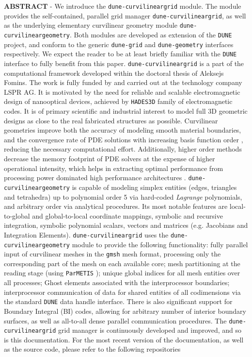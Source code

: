 \documentclass[a4paper,11pt]{article}
\newcommand{\citeParMetis}{\cite{schloegel+2002, lasalle+2013}}
\newcommand{\citeGMSH}{\cite{geuzaine+2009}}
\newcommand{\citeDune}{\cite{bastian+2008}}
\newcommand{\dune}{\setlength\emergencystretch{3cm}\texttt{DUNE}}
\newcommand{\gmsh}{\setlength\emergencystretch{3cm}\texttt{gmsh}}
\newcommand{\ParMETIS}{\setlength\emergencystretch{3cm}\texttt{ParMETIS}}
\newcommand{\hades}{\setlength\emergencystretch{3cm}\texttt{HADES3D}}
\newcommand{\dunegeom}{\setlength\emergencystretch{3cm}\texttt{dune-geometry}}
\newcommand{\dunegrid}{\setlength\emergencystretch{3cm}\texttt{dune-grid}}
\newcommand{\curvgeom}{\setlength\emergencystretch{3cm}\texttt{dune-curvilineargeometry}}
\newcommand{\curvgrid}{\setlength\emergencystretch{3cm}\texttt{dune-curvilineargrid}}
\begin{document}
\noindent \textbf{\textsc{ABSTRACT}} - We introduce the \curvgrid{} module. The module provides the self-contained, parallel grid manager \curvgrid{}, as well as the underlying elementary curvilinear geometry module \curvgeom{}. Both modules are developed as extension of the \dune{} \citeDune{} project, and conform to the generic \dunegrid{} and \dunegeom{} interfaces respectively. We expect the reader to be at least briefly familiar with the \dune{} interface to fully benefit from this paper.
\curvgrid{} is a part of the computational framework developed within the doctoral thesis of Aleksejs Fomins. The work is fully funded by and carried out at the technology company LSPR AG. It is motivated by the need for reliable and scalable electromagnetic design of nanooptical devices, achieved by \hades{} family of electromagnetic codes. It is of primary scientific and industrial interest to model full 3D geometric designs as close to the real fabricated structures as possible. Curvilinear geometries improve both the accuracy of modeling smooth material boundaries, and the convergence rate of PDE solutions with increasing basis function order \cite{fahs2011}, reducing the necessary computational effort. Additionally, higher order methods decrease the memory footprint of PDE solvers at the expense of higher operational intensity, which helps in extracting optimal performance from processing power dominated high performance architectures \cite{williams+2009}.
\curvgeom{} is capable of modeling simplex entities (edges, triangles and tetrahedra) up to polynomial order 5 via hard-coded \textit{Lagrange} polynomials, and arbitrary order via analytical procedures. Its most notable features are local-to-global and global-to-local coordinate mappings, symbolic and recursive integration, symbolic polynomial scalars, vectors and matrices (e.g. Jacobians and Integration Elements).
\curvgrid{} uses the \curvgeom{} module to provide the following functionality: fully parallel input of curvilinear meshes in the \gmsh{} \citeGMSH{} mesh format, processing only the corresponding part of the mesh on each available core; mesh partitioning at the reading stage (using \ParMETIS{} \citeParMetis{}); unique global indices for all mesh entities over all processes; Ghost elements associated with the interprocessor boundaries; interprocessor communication of data for shared entities of all codimensions via the standard \dune{} data handle interface. There is also significant support for Boundary Integral (BI) codes, allowing for arbitrary number of interior boundary surfaces, as well as all-to-all dense parallel communication procedures.
The \curvgrid{} grid manager is continuously developed and improved, and so is this documentation. %
For the most recent version of the documentation, as well as the source code, please refer to the following repositories \\
\end{document}
